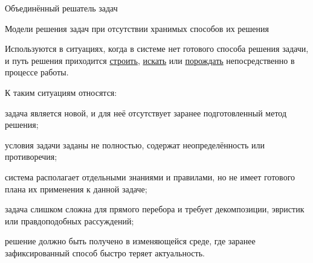 \begin{frame}{Объединённый решатель задач}
	\topline
	\justifying
	\vspace*{\fill}\\
	\small{
		\begin{SCn}
		\end{SCn}
	}
\end{frame}

\begin{frame}{Модели решения задач при отсутствии хранимых способов их решения}
	\topline
	\justifying
	
	\footnotesize
	\vspace{10mm}
	
	Используются в ситуациях, когда в системе нет готового способа решения задачи, и путь решения приходится \uline{строить}, \uline{искать} или \uline{порождать} непосредственно в процессе работы.
	
	К таким ситуациям относятся:
	\begin{textitemize}
		\item задача является новой, и для неё отсутствует заранее подготовленный метод решения;
		\item условия задачи заданы не полностью, содержат неопределённость или противоречия;
		\item система располагает отдельными знаниями и правилами, но не имеет готового плана их применения к данной задаче;
		\item задача слишком сложна для прямого перебора и требует декомпозиции, эвристик или правдоподобных рассуждений;
		\item решение должно быть получено в изменяющейся среде, где заранее зафиксированный способ быстро теряет актуальность.
	\end{textitemize}
\end{frame}

